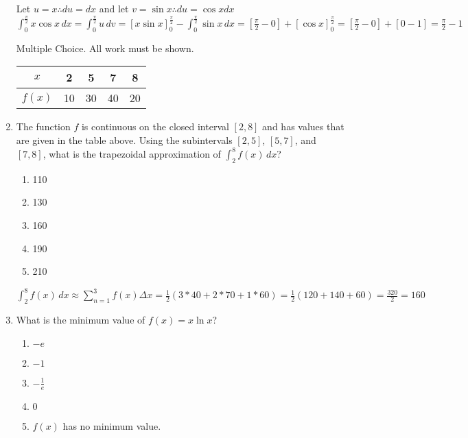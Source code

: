 \documentclass[10pt, letterpaper]{report}
\begin{document}
\begin{enumerate}
    Let $u=x\therefore du=dx$ and let $v=\sin{x}\therefore du=\cos{x}dx$ \\
    
    $\int_{0}^{\frac{\pi}{2}}{x\cos{x}}\,dx=
    \int_{0}^{\frac{\pi}{2}}{u}\,dv=
    [x\sin{x}]_{0}^{\frac{\pi}{2}}-\int_{0}^{\frac{\pi}{2}}{\sin{x}}\,dx=
    [\frac{\pi}{2}-0]+[\cos{x}]_{0}^{\frac{\pi}{2}}=
    [\frac{\pi}{2}-0]+[0-1]=\frac{\pi}{2}-1$ \\
    
    \pagebreak
    
  Multiple Choice. All work must be shown. 
  \begin{center}
    \begin{tabular}{| c | c | c | c | c |}
      \hline
      $x$ & 2 & 5 & 7 & 8 \\
      \hline
      $f(x)$ & 10 & 30 & 40 & 20 \\
      \hline
    \end{tabular}
  \end{center}
  \item{The function $f$ is continuous on the closed interval $[2,8]$ and has values that are given in the table above. Using the subintervals $[2,5]$, $[5,7]$, and $[7,8]$, what is the trapezoidal approximation of $\int_{2}^{8}{f(x)}\,dx$?} \\
    \begin{enumerate}
      \item{110}
      \item{130}
      \item{160}
      \item{190}
      \item{210}
    \end{enumerate}
  
    $\int_{2}^{8}{f(x)}\,dx\approx
    \sum_{n=1}^{3}{f(x)\Delta x}=
    \frac{1}{2}\left(3*40+2*70+1*60\right)=
    \frac{1}{2}\left(120+140+60\right)=
    \frac{320}{2}=160$ \\
    
    \hline
  \item{What is the minimum value of $f(x)=x\ln{x}$?} 
    \begin{enumerate}
      \item{$-e$}
      \item{$-1$}
      \item{$-\frac{1}{e}$}
      \item{$0$}
      \item{$f(x)$ has no minimum value.} \\
    \end{enumerate}
  

\end{enumerate}
\end{document}
